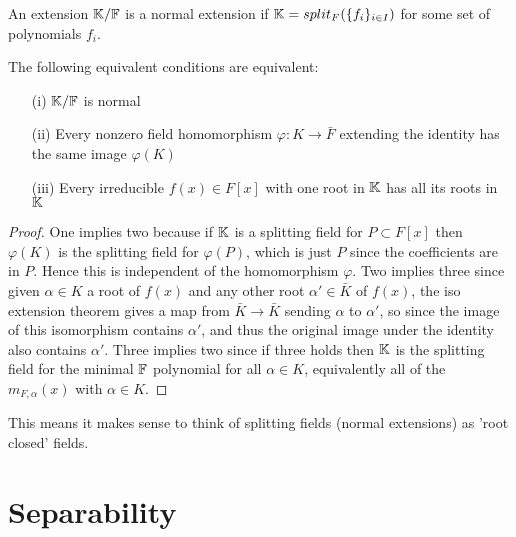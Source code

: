 \documentclass[11pt]{article}
\begin{document}
\begin{definition}
  An extension $\mathbb{K}/\mathbb{F}$ is a normal extension if $\mathbb{K} = split_F(\{f_i\}_{i \in I})$ for some set of polynomials $f_i$.
\end{definition}
\begin{theorem}
  The following equivalent conditions are equivalent:
  \begin{itemize}
  \item[(i)] $\mathbb{K}/\mathbb{F}$ is normal
  \item[(ii)] Every nonzero field homomorphism $\varphi : K \rightarrow \bar F$ extending the identity has the same image $\varphi(K)$
  \item[(iii)] Every irreducible $f(x) \in F[x]$ with one root in $\mathbb{K}$ has all its roots in $\mathbb{K}$
  \end{itemize}
\end{theorem}
\begin{proof}
  One implies two because if $\mathbb{K}$ is a splitting field for $P \subset F[x]$ then $\varphi(K)$ is the splitting field for $\varphi(P)$, which is just $P$ since the coefficients are in $P$. Hence this is independent of the homomorphism $\varphi$.
  Two implies three since given $\alpha \in K$ a root of $f(x)$ and any other root $\alpha' \in \bar K$ of $f(x)$, the iso extension theorem gives a map from $\bar K \rightarrow \bar K$ sending $\alpha$ to $\alpha'$, so since the image of this isomorphism contains $\alpha'$, and thus the original image under the identity also contains $\alpha'$.
  Three implies two since if three holds then $\mathbb{K}$ is the splitting field for the minimal $\mathbb{F}$ polynomial for all $\alpha \in K$, equivalently all of the $m_{F,\alpha}(x)$ with $\alpha \in K$.
\end{proof}
\begin{remark}
  This means it makes sense to think of splitting fields (normal extensions) as 'root closed' fields.
\end{remark}


\section*{Separability}
\end{document}
